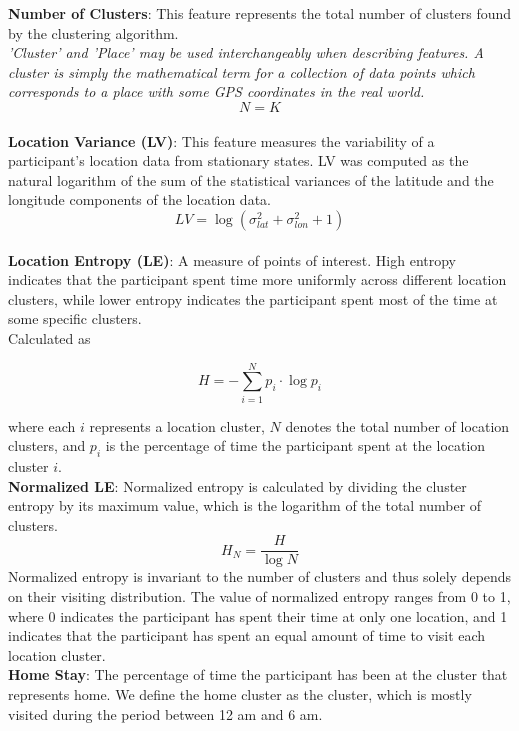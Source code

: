 \textbf{Number of Clusters}: This feature represents the total number of clusters found by the clustering algorithm.\\
\textit{'Cluster' and 'Place' may be used interchangeably when describing features. A cluster is simply the mathematical term for a collection of data points which corresponds to a place with some GPS coordinates in the real world.}\\

$$N = K$$\\

\textbf{Location Variance (LV)}: This feature measures the variability of a participant’s location data from stationary states. LV was computed as the natural logarithm of the sum of the statistical variances of the latitude and the longitude components of the location data.\\

$$LV = \log (\sigma^2_{lat} + \sigma^2_{lon} + 1) $$\\

\textbf{Location Entropy (LE)}: A measure of points of interest. High
entropy indicates that the participant spent time more uniformly across different location
clusters, while lower entropy indicates the participant spent most of the time at some
specific clusters.\\
Calculated as 

\begin{equation}
H = - \sum_{i=1}^N p_i \cdot \log p_i
\end{equation}

where each $i$ represents a location cluster, $N$ denotes the total number of location clusters, and $p_i$ is the percentage of time the participant spent at the location cluster $i$. \\

\textbf{Normalized LE}: Normalized entropy is calculated by dividing the cluster entropy by its maximum value, which is the logarithm of the total number of clusters. 
$$H_N = \frac{H}{\log N}$$
Normalized entropy is invariant to the number of clusters and thus solely depends on their visiting distribution. The value of normalized entropy ranges from 0 to 1, where 0 indicates the participant has spent their time at only one location, and 1 indicates that the participant has spent an equal amount of time to visit each location cluster.\\

\textbf{Home Stay}: The percentage of time the participant has been at the cluster that represents home. We define the home cluster as the cluster, which is mostly visited during the period between 12 am and 6 am.\\

